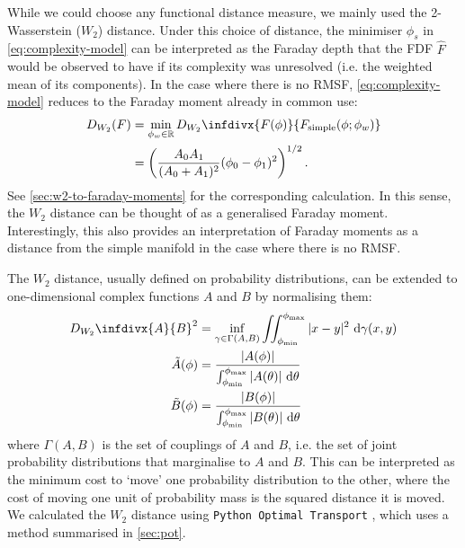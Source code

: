       While we could choose any functional distance measure, we mainly used the 2-Wasserstein ($W_2$) distance. Under this choice of distance, the minimiser $\phi_s$ in \autoref{eq:complexity-model} can be interpreted as the Faraday depth that the FDF $\hat F$ would be observed to have if its complexity was unresolved (i.e. the weighted mean of its components). In the case where there is no RMSF, \autoref{eq:complexity-model} reduces to the Faraday moment already in common use:
      \begin{align}
          D_{W_2}(F) &= \min_{\phi_w \in \mathbb{R}} D_{W_2}\infdivx{F(\phi)}{F_{\mathrm{simple}}(\phi; \phi_w)}\\
              &= \left(\frac{A_0A_1}{(A_0 + A_1)^2} (\phi_0 - \phi_1)^2\right)^{1/2}.
      \end{align}
      See \autoref{sec:w2-to-faraday-moments} for the corresponding calculation. In this sense, the $W_2$ distance can be thought of as a generalised Faraday moment. Interestingly, this also provides an interpretation of Faraday moments as a distance from the simple manifold in the case where there is no RMSF.

      The $W_2$ distance, usually defined on probability distributions, can be extended to one-dimensional complex functions $A$ and $B$ by normalising them:
      \begin{align}
        \label{eq:faraday-w2}
        D_{W_2}\infdivx{A}{B}^2 &= \inf_{\gamma \in \Gamma(A, B)} \iint_{\phi_{\min}}^{\phi_{\max}} |x - y|^2\ \mathrm{d}\gamma(x, y) \\
        \label{eq:faraday-normalised}
        \tilde A(\phi) &= \frac{|A(\phi)|}{\int_{\phi_{\min}}^{\phi_{\max}} |A(\theta)|\ \mathrm{d}\theta}\\
        \tilde B(\phi) &= \frac{|B(\phi)|}{\int_{\phi_{\min}}^{\phi_{\max}} |B(\theta)|\ \mathrm{d}\theta}
      \end{align}
      where $\Gamma(A, B)$ is the set of couplings of $A$ and $B$, i.e. the set of joint probability distributions that marginalise to $A$ and $B$. This can be interpreted as the minimum cost to `move' one probability distribution to the other, where the cost of moving one unit of probability mass is the squared distance it is moved. We calculated the $W_2$ distance using \texttt{Python Optimal Transport} \citep{flamary17pot}, which uses a method summarised in \autoref{sec:pot}.

